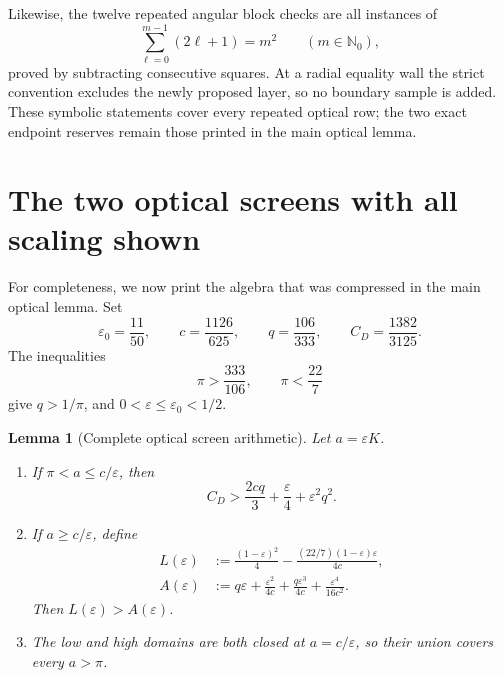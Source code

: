 \documentclass[11pt]{article}
\newtheorem{lemma}{Lemma}
\begin{document}
Likewise, the twelve repeated angular block checks are all instances of
\begin{equation}
       \sum_{\ell=0}^{m-1}(2\ell+1)=m^2
       \qquad(m\in\mathbb N_0),
       \label{eq:odd-sum}
\end{equation}
proved by subtracting consecutive squares. At a radial equality wall the
strict convention excludes the newly proposed layer, so no boundary
sample is added. These symbolic statements cover every repeated optical
row; the two exact endpoint reserves remain those printed in the main
optical lemma.

\section{The two optical screens with all scaling shown}

For completeness, we now print the algebra that was compressed in the main
optical lemma. Set
\[
 \varepsilon_0=\frac{11}{50},\qquad
 c=\frac{1126}{625},\qquad
 q=\frac{106}{333},\qquad
 C_D=\frac{1382}{3125}.
\]
The inequalities
\[
 \pi>\frac{333}{106},\qquad \pi<\frac{22}{7}
\]
give \(q>1/\pi\), and \(0<\varepsilon\leq\varepsilon_0<1/2\).

\begin{lemma}[Complete optical screen arithmetic]
\label{lem:optical-screens}
Let \(a=\varepsilon K\).
\begin{enumerate}
\item If \(\pi<a\leq c/\varepsilon\), then
\[
 C_D>
 \frac{2cq}{3}+\frac{\varepsilon}{4}+\varepsilon^2q^2.
 \tag{L}
\]
\item If \(a\geq c/\varepsilon\), define
\begin{align*}
 L(\varepsilon)
 &:=
 \frac{(1-\varepsilon)^2}{4}
 -\frac{(22/7)(1-\varepsilon)\varepsilon}{4c},\\
 A(\varepsilon)
 &:=
 q\varepsilon+\frac{\varepsilon^2}{4c}
 +\frac{q\varepsilon^3}{4c}
 +\frac{\varepsilon^4}{16c^2}.
\end{align*}
Then \(L(\varepsilon)>A(\varepsilon)\).
\item The low and high domains are both closed at
\(a=c/\varepsilon\), so their union covers every \(a>\pi\).
\end{enumerate}
\end{lemma}
\end{document}
